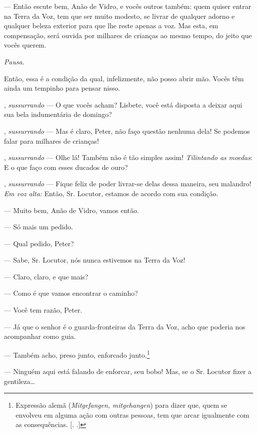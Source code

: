 \begin{myparindent}{0pt}
\begin{Parskip}
 --- Então escute bem, Anão de Vidro, e vocês outros também: quem
quiser entrar na Terra da Voz, tem que ser muito modesto, se livrar de
qualquer adorno e qualquer beleza exterior para que lhe reste apenas a
voz. Mas esta, em compensação, será ouvida por milhares de crianças ao
mesmo tempo, do jeito que vocês querem.

\emph{Pausa.}

Então, essa é a condição da qual, infelizmente, não posso abrir mão.
Vocês têm ainda um tempinho para pensar nisso.

, \emph{sussurrando} --- O que vocês acham? Lisbete,
você está disposta a deixar aqui sua bela indumentária de domingo?

, \emph{sussurrando} --- Mas é claro, Peter, não faço questão
nenhuma dela! Se podemos falar para milhares de crianças!

, \emph{sussurrando} --- Olhe lá! Também não é tão simples assim!
\emph{Tilintando as moedas}: E o que faço com esses ducados de ouro?

, \emph{sussurrando} --- Fique feliz de poder livrar-se
delas dessa maneira, seu malandro! \emph{Em voz alta:} Então, Sr.
Locutor, estamos de acordo com sua condição.

 --- Muito bem, Anão de Vidro, vamos então.

 --- Só mais um pedido.

 --- Qual pedido, Peter?

 --- Sabe, Sr. Locutor, nós nunca estivemos na Terra
da Voz!

 --- Claro, claro, e que mais?

 --- Como é que vamos encontrar o caminho?

 --- Você tem razão, Peter.

 --- Já que o senhor é o guarda-fronteiras da Terra
da Voz, acho que poderia nos acompanhar como guia.

 --- Também acho, preso junto, enforcado junto.\footnote{Expressão
  alemã (\emph{Mitgefangen, mitgehangen}) para dizer que, quem se
  envolveu em alguma ação com outras pessoas, tem que arcar igualmente
  com as consequências. [. .]}

 --- Ninguém aqui está falando de enforcar, seu bobo! Mas, se o
Sr. Locutor fizer a gentileza\ldots{}


\end{Parskip}
\end{myparindent}

